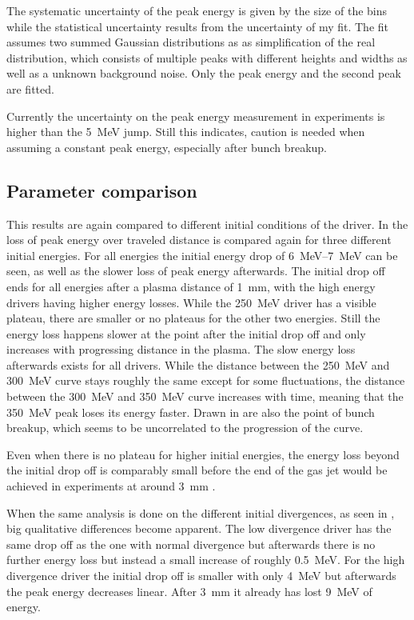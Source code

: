 \documentclass[bachelor_thesis]{subfiles}
\begin{document}
The systematic uncertainty of the peak energy is given by the size of the bins while the statistical uncertainty results from the uncertainty of my fit.  The fit assumes two summed Gaussian distributions as as
simplification of the real distribution, which consists of multiple peaks with different heights and widths as well as a unknown background noise. Only the peak energy and the second peak are fitted.

Currently the uncertainty on the peak energy measurement in experiments is higher than the \qty{5}{\MeV} jump. Still this indicates, caution is needed when assuming a constant peak energy, especially after bunch breakup.

\subsection{Parameter comparison}
This results are again compared to different initial conditions of the driver. In  the loss of peak energy over traveled distance is compared again for three different initial energies.
For all energies the initial energy drop of \qtyrange{6}{7}{\MeV} can be seen, as well as the slower loss of peak energy afterwards. The initial drop off ends for all energies after a plasma distance of \qty{1}{\mm}, with the high energy drivers having higher energy losses. 
While the \qty{250}{\MeV} driver has a visible plateau, there are smaller or no plateaus for the other two energies. Still the energy loss happens slower at the point after the initial drop off and only increases with progressing distance in the plasma.
The slow energy loss afterwards exists for all drivers. While the distance between the \qty{250}{\MeV} and \qty{300}{\MeV} curve stays roughly the same except for some fluctuations, 
the distance between the \qty{300}{\MeV} and \qty{350}{\MeV} curve increases with time, meaning that the \qty{350}{\MeV} peak loses its energy faster. Drawn in are also the point of bunch breakup, which seems to be uncorrelated to the progression of the curve.

Even when there is no plateau for higher initial energies, the energy loss beyond the initial drop off is comparably small before the end of the gas jet would be achieved in experiments at around \qty{3}{\mm} \cite{Schoebel2022}.


When the same analysis is done on the different initial divergences, as seen in , big qualitative differences become apparent. The low divergence driver has the same drop off as the one with normal divergence but afterwards
there is no further energy loss but instead a small increase of roughly \qty{0.5}{\MeV}. For the high divergence driver the initial drop off is smaller with only \qty{4}{\MeV} but afterwards the peak energy decreases linear. After \qty{3}{\mm}
it already has lost \qty{9}{\MeV} of energy. 
\end{document}
